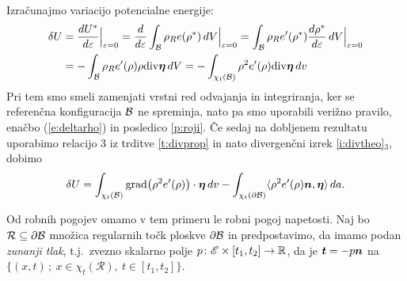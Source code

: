 Izračunajmo variacijo potencialne energije:
\begin{align*} 
	\delta U &=\frac{dU^*}{d\varepsilon}\Big|_{\varepsilon=0}=\frac{d}{d\varepsilon}
	\int_{\mathcal B}\rho_R e(\rho^*)\,dV \Big|_{\varepsilon=0} =
	\int_{\mathcal B}\rho_R e'(\rho^*)\frac{d\rho^*}{d\varepsilon}\,dV \Big|_{\varepsilon=0} \\
	&= -\int_{\mathcal B}\rho_R e'(\rho)\rho\mathrm{div}\boldsymbol \eta\,dV
	= -\int_{\chi_t(\mathcal B)}\rho^2 e'(\rho)\mathrm{div}\boldsymbol \eta\,dv
\end{align*}
Pri tem smo smeli zamenjati vrstni red odvajanja in integriranja, ker se referenčna
konfiguracija $\mathcal B$ ne spreminja, nato pa smo uporabili verižno pravilo, enačbo
(\ref{e:deltarho}) in posledico \ref{p:roji}.
Če sedaj na dobljenem rezultatu uporabimo relacijo 3 iz trditve \ref{t:divprop} in
nato divergenčni izrek \ref{i:divtheo}$_3$, dobimo
\begin{equation} \label{e:varpot}
	\delta U=\int_{\chi_t(\mathcal B)}\mathrm{grad}\big(\rho^2 e'(\rho)\big)\cdot\boldsymbol \eta\,dv
	-\int_{\chi_t(\partial \mathcal B)}\langle\rho^2 e'(\rho)\boldsymbol n,\boldsymbol \eta\rangle\,da.
\end{equation}

Od robnih pogojev omamo v tem primeru le robni pogoj napetosti.
Naj bo $\mathcal{R}\subseteq\partial \mathcal B$ množica regularnih točk ploskve $\partial \mathcal B$ in
predpostavimo, da imamo podan \emph{zunanji tlak}, t.j.~zvezno skalarno polje
$p\colon \mathscr E\times[t_1,t_2]\to\mathbb R$, da je $\boldsymbol t=-p\boldsymbol n$ na
$\{(x,t)\,;\ x\in\chi_t(\mathcal{R}),\ t\in[t_1,t_2]\}$.

